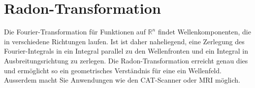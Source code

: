 %
%
%
\chapter{Radon-Transformation
\label{buch:chapter:radon}}
Die Fourier-Transformation für Funktionen auf $\mathbb{R}^n$ findet
Wellenkomponenten, die in verschiedene Richtungen laufen. 
Ist ist daher naheliegend, eine Zerlegung des Fourier-Integrals in
ein Integral parallel zu den Wellenfronten und ein Integral in 
Ausbreitungsrichtung zu zerlegen.
Die Radon-Transformation erreicht genau dies und ermöglicht so
ein geometrisches Verständnis für eine ein Wellenfeld.
Ausserdem macht Sie Anwendungen wie den CAT-Scanner oder 
MRI möglich.








